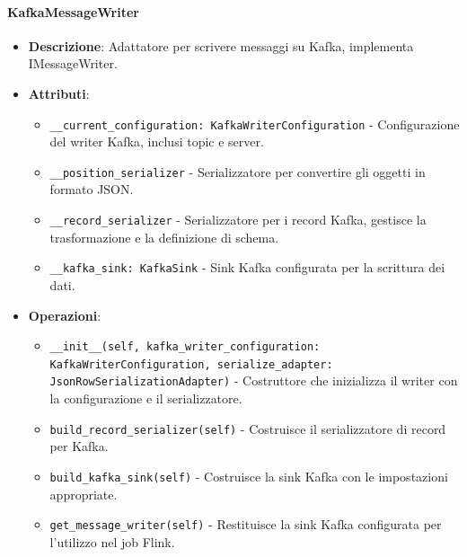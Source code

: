 \documentclass[10pt]{article}
\begin{document}
    \paragraph{KafkaMessageWriter}
    \begin{itemize}
        \item \textbf{Descrizione}: Adattatore per scrivere messaggi su Kafka, implementa IMessageWriter.
        \item \textbf{Attributi}:
        \begin{itemize}
            \item \texttt{\_\_current\_configuration: KafkaWriterConfiguration} - Configurazione del writer Kafka, inclusi topic e server.
            \item \texttt{\_\_position\_serializer} - Serializzatore per convertire gli oggetti in formato JSON.
            \item \texttt{\_\_record\_serializer} - Serializzatore per i record Kafka, gestisce la trasformazione e la definizione di schema.
            \item \texttt{\_\_kafka\_sink: KafkaSink} - Sink Kafka configurata per la scrittura dei dati.
        \end{itemize}
        \item \textbf{Operazioni}:
        \begin{itemize}
            \item \texttt{\_\_init\_\_(self, kafka\_writer\_configuration: KafkaWriterConfiguration, serialize\_adapter: JsonRowSerializationAdapter)} - Costruttore che inizializza il writer con la configurazione e il serializzatore.
            \item \texttt{build\_record\_serializer(self)} - Costruisce il serializzatore di record per Kafka.
            \item \texttt{build\_kafka\_sink(self)} - Costruisce la sink Kafka con le impostazioni appropriate.
            \item \texttt{get\_message\_writer(self)} - Restituisce la sink Kafka configurata per l'utilizzo nel job Flink.
        \end{itemize}
    \end{itemize}
\end{document}
